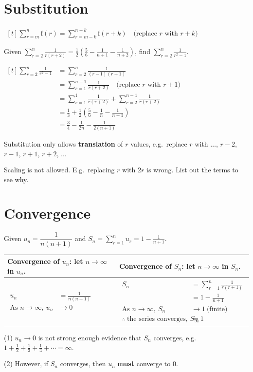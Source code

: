 \documentclass[a4paper,11pt,oneside]{book}
\providecommand{\cdisp}[1]{\par\noindent$\displaystyle\begin{aligned}[t]#1\end{aligned}$\par\smallskip}
\renewcommand{\cdisp}[1]{\par\noindent\hfill$\displaystyle\begin{aligned}[t]#1\end{aligned}$\hfill\null\par\smallskip}
\begin{document}
\section{Substitution}
\cdisp{\sum_{r=m}^{n}\mathrm{f}(r)=\sum_{r=m-k}^{n-k}\mathrm{f}(r+k)\quad\text{(replace $r$ with $r+k$)}}
\exlab
Given $\displaystyle\sum_{r=2}^{n}\frac{1}{r(r+2)}=\frac12\left(\frac56-\frac{1}{n+1}-\frac{1}{n+2}\right)$, find $\displaystyle\sum_{r=2}^{n}\frac{1}{r^{2}-1}$.
\cdisp{\sum_{r=2}^{n}\frac{1}{r^{2}-1}&=\sum_{r=2}^{n}\frac{1}{(r-1)(r+1)}\\&=\sum_{r=1}^{n-1}\frac{1}{r(r+2)}\quad\text{(replace $r$ with $r+1$)}\\&=\sum_{r=1}^{1}\frac{1}{r(r+2)}+\sum_{r=2}^{n-1}\frac{1}{r(r+2)}\\&=\frac13+\frac12\left(\frac56-\frac1n-\frac{1}{n+1}\right)\\&=\frac34-\frac{1}{2n}-\frac{1}{2(n+1)}}
\begin{info}[title=Note]
Substitution only allows \textbf{translation} of $r$ values, e.g.\ replace $r$ with $\ldots$, $r-2$, $r-1$, $r+1$, $r+2$, $\ldots$\par
Scaling is not allowed. E.g.\ replacing $r$ with $2r$ is wrong. List out the terms to see why.
\end{info}
\clearpage
\section{Convergence}
\exlab
Given $u_n=\dfrac{1}{n(n+1)}$ and $S_n=\displaystyle\sum_{r=1}^{n}u_r=1-\frac{1}{n+1}$.\par\smallskip
{\centering\renewcommand{\arraystretch}{1.3}\begin{tabular}{|p{}|p{}|}\hline
\textbf{Convergence of $u_n$:} let $n\to\infty$ in $u_n$. & \textbf{Convergence of $S_n$:} let $n\to\infty$ in $S_n$.\\\hline
$\displaystyle\begin{aligned}u_n&=\frac{1}{n(n+1)}\\\text{As }n\to\infty,\ u_n&\to0\end{aligned}$ &
$\displaystyle\begin{aligned}S_n&=\sum_{r=1}^{n}\frac{1}{r(r+1)}\\&=1-\frac{1}{n+1}\\\text{As }n\to\infty,\ S_n&\to1\ \text{(finite)}\\\therefore\ \text{the series converges},\ S_\infty&=1\end{aligned}$\\\hline
\end{tabular}\par}
\begin{info}[title=Note]
(1) $u_n\to0$ is not strong enough evidence that $S_n$ converges, e.g.\ $1+\frac12+\frac13+\frac14+\cdots=\infty$.\par
(2) However, if $S_n$ converges, then $u_n$ \textbf{must} converge to $0$.
\end{info}
\end{document}
